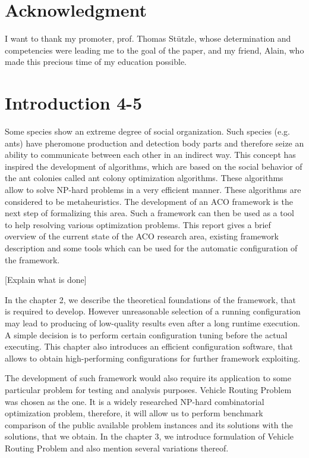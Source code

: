 \documentclass[11pt,a4paper,oneside]{book}
\begin{document}
\chapter*{Acknowledgment}
\thispagestyle{empty} 

\noindent I want to thank my promoter, prof. Thomas St{\"u}tzle, whose determination and competencies were leading me to the goal of the paper, and my friend, Alain, who made this precious time of my education possible.

\thispagestyle{empty} 
\setcounter{page}{0}
\tableofcontents
\mainmatter 
\chapter{Introduction 4-5}
\setcounter{page}{1}
\vspace*{0.5cm}

Some species show an extreme degree of social organization. Such species (e.g. ants) have pheromone production and detection body parts and therefore seize an ability to communicate between each other in an indirect way. This concept has inspired the development of algorithms, which are based on the social behavior of the ant colonies called ant colony optimization algorithms. These algorithms allow to solve NP-hard problems in a very efficient manner. These algorithms are considered to be metaheuristics. The development of an ACO framework is the next step of formalizing this area. Such a framework can then be used as a tool to help resolving various optimization problems. This report gives a brief overview of the current state of the ACO research area, existing framework description and some tools which can be used for the automatic configuration of the framework.

[Explain what is done]

In the chapter 2, we describe the theoretical foundations of the framework, that is required to develop. However unreasonable selection of a running configuration may lead to producing of low-quality results even after a long runtime execution. A simple decision is to perform certain configuration tuning before the actual executing. This chapter also introduces an efficient configuration software, that allows to obtain high-performing configurations for further framework exploiting.

The development of such framework would also require its application to some particular problem for testing and analysis purposes. Vehicle Routing Problem was chosen as the one. It is a widely researched NP-hard combinatorial optimization problem, therefore, it will allow us to perform benchmark comparison of the public available problem instances and its solutions with the solutions, that we obtain. In the chapter 3, we introduce formulation of Vehicle Routing Problem and also mention several variations thereof.
\end{document}
